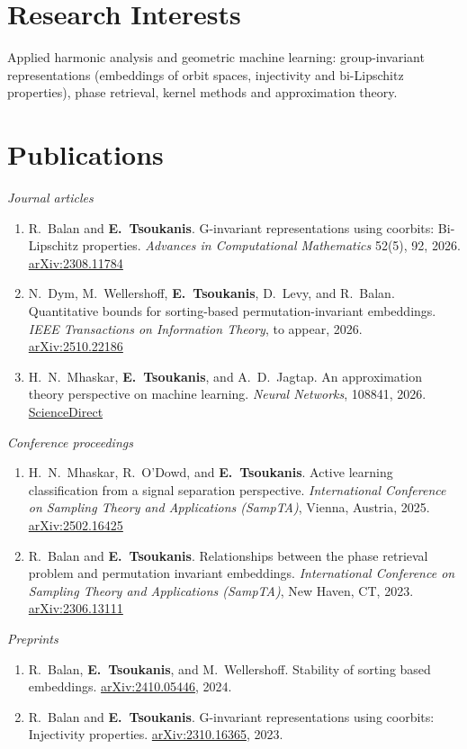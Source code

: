 \documentclass[11pt,letterpaper]{article}
\newcommand{\me}{\textbf{E.~Tsoukanis}}
\newcommand{\pubsub}[1]{\vspace{0.4ex}\textit{#1}\par\vspace{0.2ex}}
\begin{document}
\section{Research Interests}
Applied harmonic analysis and geometric machine learning: group-invariant representations
(embeddings of orbit spaces, injectivity and bi-Lipschitz properties), phase retrieval,
kernel methods and approximation theory.

\section{Publications}
\pubsub{Journal articles}
\begin{enumerate}
  \item R.~Balan and \me.
    G-invariant representations using coorbits: Bi-Lipschitz properties.
    \textit{Advances in Computational Mathematics} 52(5), 92, 2026.
    \href{https://arxiv.org/abs/2308.11784}{arXiv:2308.11784}
  \item N.~Dym, M.~Wellershoff, \me, D.~Levy, and R.~Balan.
    Quantitative bounds for sorting-based permutation-invariant embeddings.
    \textit{IEEE Transactions on Information Theory}, to appear, 2026.
    \href{https://arxiv.org/abs/2510.22186}{arXiv:2510.22186}
  \item H.~N.~Mhaskar, \me, and A.~D.~Jagtap.
    An approximation theory perspective on machine learning.
    \textit{Neural Networks}, 108841, 2026.
    \href{https://www.sciencedirect.com/science/article/pii/S0893608026003035}{ScienceDirect}
\end{enumerate}
\pubsub{Conference proceedings}
\begin{enumerate}[resume]
  \item H.~N.~Mhaskar, R.~O'Dowd, and \me.
    Active learning classification from a signal separation perspective.
    \textit{International Conference on Sampling Theory and Applications (SampTA)}, Vienna, Austria, 2025.
    \href{https://arxiv.org/abs/2502.16425}{arXiv:2502.16425}
  \item R.~Balan and \me.
    Relationships between the phase retrieval problem and permutation invariant embeddings.
    \textit{International Conference on Sampling Theory and Applications (SampTA)}, New Haven, CT, 2023.
    \href{https://arxiv.org/abs/2306.13111}{arXiv:2306.13111}
\end{enumerate}
\pubsub{Preprints}
\begin{enumerate}[resume]
  \item R.~Balan, \me, and M.~Wellershoff.
    Stability of sorting based embeddings.
    \href{https://arxiv.org/abs/2410.05446}{arXiv:2410.05446}, 2024.
  \item R.~Balan and \me.
    G-invariant representations using coorbits: Injectivity properties.
    \href{https://arxiv.org/abs/2310.16365}{arXiv:2310.16365}, 2023.
\end{enumerate}
\end{document}
